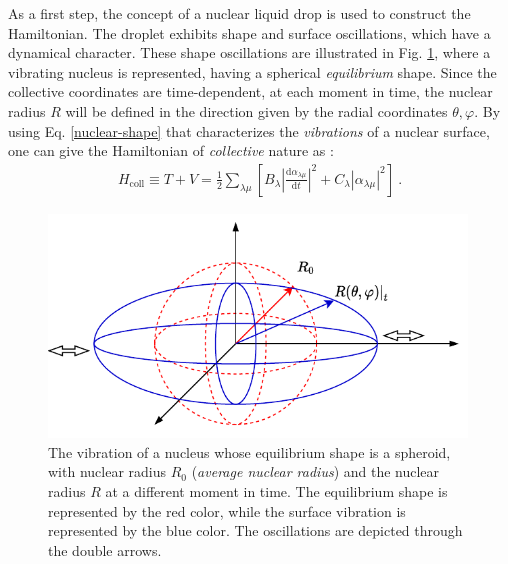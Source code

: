 As a first step, the concept of a nuclear liquid drop is used to construct the Hamiltonian. The droplet exhibits shape and surface oscillations, which have a dynamical character. These shape oscillations are illustrated in Fig. \ref{fig-nuclear-vibration}, where a vibrating nucleus is represented, having a spherical \emph{equilibrium} shape. Since the collective coordinates are time-dependent, at each moment in time, the nuclear radius $R$ will be defined in the direction given by the radial coordinates $\theta,\varphi$. By using Eq. \eqref{nuclear-shape} that characterizes the \emph{vibrations} of a nuclear surface, one can give the Hamiltonian of \emph{collective} nature as \cite{ring2004nuclear,bertulani2007nuclear}:
\begin{align}
    H_\text{coll}\equiv T+V=\frac{1}{2}\sum_{\lambda\mu}\left[B_\lambda\left|\frac{\text{d}\alpha_{\lambda\mu}}{\text{d}t}\right|^2+C_\lambda|\alpha_{\lambda\mu}|^2\right]\ .
    \label{collective-hamiltonian-stiffness-inertia}
\end{align}
\begin{figure}
    \centering
    \includegraphics[width=0.99\textwidth]{Chapters/Figures/shape_oscillations.pdf}
    \caption{The vibration of a nucleus whose equilibrium shape is a spheroid, with nuclear radius $R_0$ (\emph{average nuclear radius}) and the nuclear radius $R$ at a different moment in time. The equilibrium shape is represented by the red color, while the surface vibration is represented by the blue color. The oscillations are depicted through the double arrows.}
    \label{fig-nuclear-vibration}
\end{figure}

